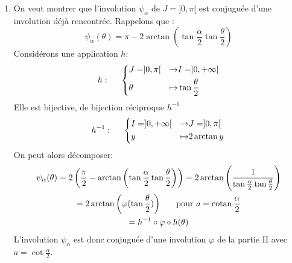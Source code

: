 \begin{enumerate}
\begin{enumerate}
  \item  D'après la question précédente:
\begin{displaymath}
\psi_{\alpha}(\theta) = \pi -2\arctan\left(\tan\frac{\alpha}{2}\tan\frac{\theta}{2} \right)
\end{displaymath}
Vérifions que $\psi_\alpha$ est une involution:
\begin{multline*}
\tan \frac{\psi_\alpha(\theta)}{2} = \frac{1}{\tan\frac{\alpha}{2}\tan\frac{\theta}{2}}
\Rightarrow
\tan \frac{\alpha}{2}\tan \frac{\psi_\alpha(\theta)}{2} = \frac{1}{\tan\frac{\theta}{2}}\\
\Rightarrow \arctan\left(\tan \frac{\alpha}{2}\tan \frac{\psi_\alpha(\theta)}{2} \right)
= \frac{\pi}{2} -\frac{\theta}{2}\\
\Rightarrow
\psi_\alpha \circ \psi_\alpha(\theta)
= \pi -2\arctan\left(\tan \frac{\alpha}{2}\tan \frac{\psi_\alpha(\theta)}{2} \right) = \theta
\end{multline*}
On a pu simplifier les $\arctan \circ \tan$ car tout se passe entre $0$ et $\frac{\pi}{2}$.
\end{enumerate}

\item On veut montrer que l'involution $\psi_\alpha$ de $J=]0,\pi[$ est conjuguée d'une involution déjà rencontrée. Rappelons que :
\begin{displaymath}
\psi_{\alpha}(\theta) = \pi -2\arctan\left(\tan\frac{\alpha}{2}\tan\frac{\theta}{2} \right)
\end{displaymath}
Considérons une application $h$:
\begin{displaymath}
  h:\hspace{0.5cm}
\left\lbrace 
\begin{aligned}
  &J=]0,\pi[ &\rightarrow& I =]0,+\infty[ \\
  &\theta &\mapsto& \tan \frac{\theta}{2}
\end{aligned}
\right. 
\end{displaymath}
Elle est bijective, de bijection réciproque $h^{-1}$
\begin{displaymath}
  h^{-1}:\hspace{0.5cm}
\left\lbrace 
\begin{aligned}
  &I =]0,+\infty[ &\rightarrow&  J=]0,\pi[ \\
  &y &\mapsto& 2\arctan y
\end{aligned}
\right. 
\end{displaymath}
On peut alors décomposer:
\begin{multline*}
\psi_\alpha(\theta) = 2\left( \frac{\pi}{2}-\arctan\left(\tan\frac{\alpha}{2}\tan \frac{\theta}{2} \right) \right) 
= 2\arctan\left( \frac{1}{\tan\frac{\alpha}{2}\tan \frac{\theta}{2}} \right) \\
= 2\arctan\left(\varphi(\tan \frac{\theta}{2})\right)\hspace{0.5cm}\text{ pour } a =\cot\frac{\alpha}{2} \\
= h^{-1}\circ \varphi \circ h(\theta)
\end{multline*}
L'involution $\psi_\alpha$ est donc conjuguée d'une involution $\varphi$ de la partie II avec $a =\cot\frac{\alpha}{2}$.


\end{enumerate}
